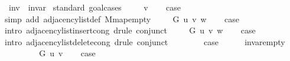 \begin{isabellebody}
\ \ inv\ {\isacharequal}{\kern0pt}\ invar\isanewline
%
\isadelimproof
%
\endisadelimproof
%
\isatagproof
{}\isamarkupfalse%
\ {\isacharparenleft}{\kern0pt}standard{\isacharcomma}{\kern0pt}\ goal{\isacharunderscore}{\kern0pt}cases{\isacharparenright}{\kern0pt}\isanewline
\ \ \isamarkupfalse%
\ {\isacharparenleft}{\kern0pt}{}\ v{\isacharparenright}{\kern0pt}\isanewline
\ \ \isamarkupfalse%
\ {\isacharquery}{\kern0pt}case\isanewline
\ \ \ \ \isamarkupfalse%
\ {\isacharparenleft}{\kern0pt}simp\ add{\isacharcolon}{\kern0pt}\ adjacency{\isacharunderscore}{\kern0pt}list{\isacharunderscore}{\kern0pt}def\ M{\isachardot}{\kern0pt}map{\isacharunderscore}{\kern0pt}empty{\isacharparenright}{\kern0pt}\isanewline
{}\isamarkupfalse%
\isanewline
\ \ \isamarkupfalse%
\ {\isacharparenleft}{\kern0pt}{}\ G\ u\ v\ w{\isacharparenright}{\kern0pt}\isanewline
\ \ \isamarkupfalse%
\ {\isacharquery}{\kern0pt}case\isanewline
\ \ \ \ \isamarkupfalse%
\ {\isacharparenleft}{\kern0pt}intro\ adjacency{\isacharunderscore}{\kern0pt}list{\isacharunderscore}{\kern0pt}insert{\isacharprime}{\kern0pt}{\isacharunderscore}{\kern0pt}cong{\isacharparenright}{\kern0pt}\ {\isacharparenleft}{\kern0pt}drule\ conjunct{}{\isacharparenright}{\kern0pt}\isanewline
{}\isamarkupfalse%
\isanewline
\ \ \isamarkupfalse%
\ {\isacharparenleft}{\kern0pt}{}\ G\ u\ v\ w{\isacharparenright}{\kern0pt}\isanewline
\ \ \isamarkupfalse%
\ {\isacharquery}{\kern0pt}case\isanewline
\ \ \ \ \isamarkupfalse%
\ {\isacharparenleft}{\kern0pt}intro\ adjacency{\isacharunderscore}{\kern0pt}list{\isacharunderscore}{\kern0pt}delete{\isacharprime}{\kern0pt}{\isacharunderscore}{\kern0pt}cong{\isacharparenright}{\kern0pt}\ {\isacharparenleft}{\kern0pt}drule\ conjunct{}{\isacharparenright}{\kern0pt}\isanewline
{}\isamarkupfalse%
\isanewline
\ \ \isamarkupfalse%
\ {}\isanewline
\ \ \isamarkupfalse%
\ {\isacharquery}{\kern0pt}case\isanewline
\ \ \ \ \isamarkupfalse%
\ invar{\isacharunderscore}{\kern0pt}empty\isanewline
\ \ \ \ \isacommand{{\isachardot}{\kern0pt}}\isamarkupfalse%
\isanewline
{}\isamarkupfalse%
\isanewline
\ \ \isamarkupfalse%
\ {\isacharparenleft}{\kern0pt}{}\ G\ u\ v{\isacharparenright}{\kern0pt}\isanewline
\ \ \isamarkupfalse%
\ {\isacharquery}{\kern0pt}case\isanewline

\end{isabellebody}
